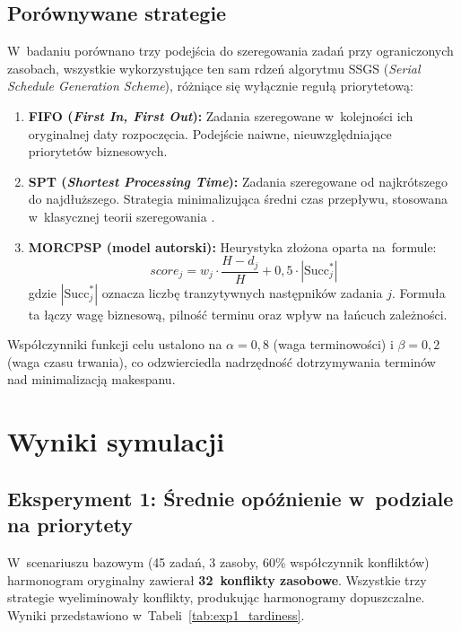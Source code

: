 \subsection{Porównywane strategie}
W~badaniu porównano trzy podejścia do szeregowania zadań przy ograniczonych zasobach, wszystkie wykorzystujące ten sam rdzeń algorytmu SSGS (\textit{Serial Schedule Generation Scheme}), różniące się wyłącznie regułą priorytetową:
\begin{enumerate}
    \item \textbf{FIFO (\textit{First In, First Out}):} Zadania szeregowane w~kolejności ich oryginalnej daty rozpoczęcia. Podejście naiwne, nieuwzględniające priorytetów biznesowych.
    \item \textbf{SPT (\textit{Shortest Processing Time}):} Zadania szeregowane od najkrótszego do najdłuższego. Strategia minimalizująca średni czas przepływu, stosowana w~klasycznej teorii szeregowania \cite{pinedo}.
    \item \textbf{MORCPSP (model autorski):} Heurystyka złożona oparta na~formule:
    \begin{equation}
        score_j = w_j \cdot \frac{H - d_j}{H} + 0{,}5 \cdot |\text{Succ}_j^*|
    \end{equation}
    gdzie $|\text{Succ}_j^*|$ oznacza liczbę tranzytywnych następników zadania $j$. Formuła ta łączy wagę biznesową, pilność terminu oraz wpływ na łańcuch zależności.
\end{enumerate}

Współczynniki funkcji celu ustalono na $\alpha = 0{,}8$ (waga terminowości) i $\beta = 0{,}2$ (waga czasu trwania), co odzwierciedla nadrzędność dotrzymywania terminów nad minimalizacją makespanu.

\section{Wyniki symulacji}

\subsection{Eksperyment 1: Średnie opóźnienie w~podziale na priorytety}
W~scenariuszu bazowym (45 zadań, 3 zasoby, 60\% współczynnik konfliktów) harmonogram oryginalny zawierał \textbf{32~konflikty zasobowe}. Wszystkie trzy strategie wyeliminowały konflikty, produkując harmonogramy dopuszczalne. Wyniki przedstawiono w~Tabeli~\ref{tab:exp1_tardiness}.

